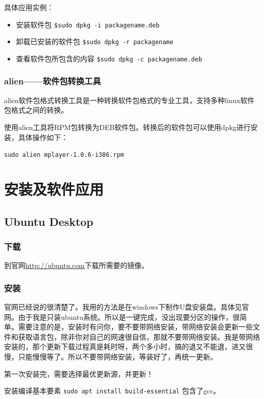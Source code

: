 具体应用实例：
\begin{itemize}
\item 安装软件包\quad
\verb*|$sudo dpkg -i packagename.deb|

\item 卸载已安装的软件包\quad
\verb*|$sudo dpkg -r packagename|

\item 查看软件包所包含的内容\quad
\verb*|$sudo dpkg -c packagename.deb|
\end{itemize}



\subsection{alien——软件包转换工具}
alien软件包格式转换工具是一种转换软件包格式的专业工具，支持多种linux软件包格式之间的转换。

使用alien工具将RPM包转换为DEB软件包。转换后的软件包可以使用dpkg进行安装，具体操作如下：

\verb|sudo alien mplayer-1.0.6-i386.rpm|





\chapter{安装及软件应用}
\section{Ubuntu Desktop} 
 \subsection{下载}
  到官网\url{http://ubuntu.com}下载所需要的镜像。 

\subsection{安装}   
 官网已经说的很清楚了。我用的方法是在windows下制作U盘安装盘。具体见官网。由于我是只装ubuntu系统。所以是一键完成，没出现要分区的操作，很简单。需要注意的是，安装时有问你，要不要带网络安装，带网络安装会更新一些文件和获取语言包，除非你对自己的网速很自信，那就不要带网络安装。我是带网络安装的，那个更新下载过程真是耗时呀，两个多小时，搞的退又不能退，进又很慢，只能慢慢等了。所以不要带网络安装，等装好了，再统一更新。
 
第一次安装完，需要选择最优更新源，并更新！

安装编译基本要素 \verb|sudo apt install build-essential| 包含了gcc。

